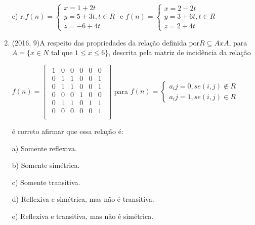 \documentclass{article}
\begin{document}
\begin{enumerate}
e) r:$
f(n) = \left \{ \begin{matrix} 
x = 1 + 2t\\
y = 5 + 3t, t \in R\\
z = -6 + 4t
\end{matrix} \right.$ e 
$
f(n) = \left \{ \begin{matrix} 
x = 2 - 2t\\
y = 3 + 6t, t \in R\\
z = 2 + 4t
\end{matrix} \right.$\newline




\item (2016, 9)A respeito das propriedades da relação definida por$ R\subseteq A x A$, para$ A=\{x \in N $ tal que $1\leq x \leq 6\}$, descrita pela matriz de incidência da relação\newline


$f(n) = \left [ \begin{matrix} 

    \begin{array}{cccccc}
    1 & 0 & 0 & 0 & 0 & 0 \\
    0 & 1 & 1 & 0 & 0 & 1 \\
    0 & 1 & 1 & 0 & 0 & 1 \\
    0 & 0 & 0 & 1 & 0 & 0 \\
    0 & 1 & 1 & 0 & 1 & 1 \\
    0 & 0 & 0 & 0 & 0 & 1 \\
\end{array}

\end{matrix} \right ] $ 
para 
$f(n) = \left \{ \begin{matrix} 

a_ij = 0, se (i, j) \not\in R\\
a_ij = 1, se (i, j) \in R

\end{matrix} \right. $ 

é correto afirmar que essa relação é:\newline

a) Somente reflexiva.

b) Somente simétrica.

c) Somente transitiva.

d) Reflexiva e simétrica, mas não é transitiva.

e) Reflexiva e transitiva, mas não é simétrica.\newline







\end{enumerate}
\end{document}
